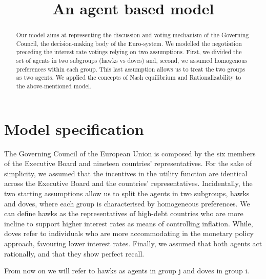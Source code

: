 \documentclass[12pt]{article}
\title{An agent based model }
\author{ }
\begin{document}
\maketitle
\begin{abstract}
    Our model aims at representing the discussion and voting mechanism of the Governing Council, the decision-making body of the Euro-system.
We modelled the negotiation preceding the interest rate votings relying on two assumptions. First, we divided the set of agents in two subgroups (hawks vs doves) and, second, we assumed homogenous preferences within each group. This last assumption allows us to treat the two groups as two agents.
We applied the concepts of Nash equilibrium and Rationalizability to the above-mentioned model.

    
    
\end{abstract}
\section{Model specification}
The Governing Council of the European Union is composed by the six members of the Executive Board and nineteen countries' representatives. For the sake of simplicity, we assumed that the incentives in the utility function are identical across the Executive Board and the countries' representatives. 
Incidentally, the two starting assumptions allow us to split the agents in two subgroups, hawks and doves, where each group is characterised by homogeneous preferences. We can define hawks as the representatives of high-debt countries who are more incline to support higher interest rates as means of controlling inflation. 
While, doves refer to individuals who are more accommodating in the monetary policy approach, favouring lower interest rates. Finally, we assumed that both agents act rationally, and that they show perfect recall. \par
From now on we will refer to hawks as agents in group j and doves in group i.
\end{document}

